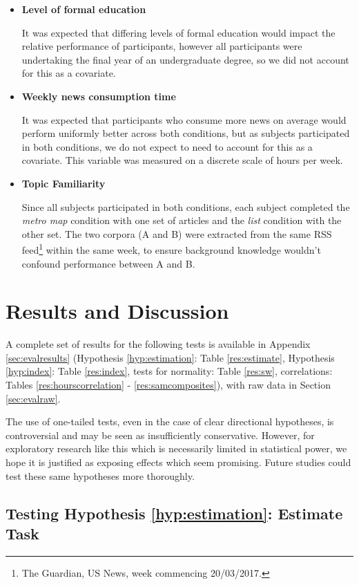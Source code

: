 \begin{itemize}
	\item\textbf{Level of formal education} \par
		It was expected that differing levels of formal education would impact the relative performance of participants, however all participants were undertaking the final year of an undergraduate degree, so we did not account for this as a covariate.
	\item\textbf{Weekly news consumption time} \par
		It was expected that participants who consume more news on average would perform uniformly better across both conditions, but as subjects participated in both conditions, we do not expect to need to account for this as a covariate. This variable was measured on a discrete scale of hours per week.
	\item\textbf{Topic Familiarity} \par
		Since all subjects participated in both conditions, each subject completed the \textit{metro map} condition with one set of articles and the \textit{list} condition with the other set. The two corpora (A and B) were extracted from the same RSS feed\footnote{The Guardian, US News, week commencing 20/03/2017.} within the same week, to ensure background knowledge wouldn't confound performance between A and B.
\end{itemize}

\section{Results and Discussion}

A complete set of results for the following tests is available in Appendix \ref{sec:evalresults} (Hypothesis \ref{hyp:estimation}: Table \ref{res:estimate}, Hypothesis \ref{hyp:index}: Table \ref{res:index}, tests for normality: Table \ref{res:sw}, correlations: Tables \ref{res:hourscorrelation} -  \ref{res:samcomposites}), with raw data in Section \ref{sec:evalraw}.

The use of one-tailed tests, even in the case of clear directional hypotheses, is controversial and may be seen as insufficiently conservative. However, for exploratory research like this which is necessarily limited in statistical power, we hope it is justified as exposing effects which seem promising. Future studies could test these same hypotheses more thoroughly.

\subsection{Testing Hypothesis \ref{hyp:estimation}: Estimate Task}


